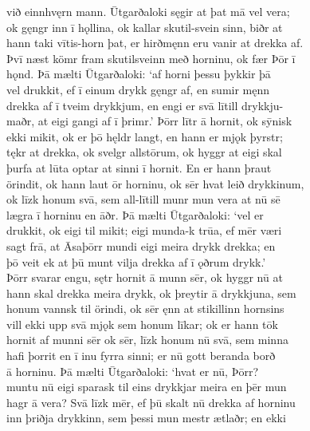 \documentclass[12pt,letterpaper]{book}
\begin{document}
\begin{linenumbers}
við einnhvęrn mann.  Ūtgarðaloki sęgir at þat mā vel vera;\\
ok gęngr inn ī hǫllina, ok kallar skutil-svein sinn, biðr at\\
hann taki vītis-horn þat, er hirðmęnn eru vanir at drekka af.\\
Þvī næst kömr fram skutilsveinn með horninu, ok fær Þōr ī\\
hǫnd.  Þā mælti Ūtgarðaloki: `af horni þessu þykkir þā\\
vel drukkit, ef ī einum drykk gęngr af, en sumir męnn\\
drekka af ī tveim drykkjum, en engi er svā lītill drykkju-\\
maðr, at eigi gangi af ī þrimr.'  Þōrr lītr ā hornit, ok sȳnisk\\
ekki mikit, ok er þō hęldr langt, en hann er mjǫk þyrstr;\\
tękr at drekka, ok svelgr allstōrum, ok hyggr at eigi skal\\
þurfa at lūta optar at sinni ī hornit.  En er hann þraut\\
örindit, ok hann laut ōr horninu, ok sēr hvat leið drykkinum,\\
ok līzk honum svā, sem all-lītill munr mun vera at nū sē\\
lægra ī horninu en āðr.  Þā mælti Ūtgarðaloki: `vel er\\
drukkit, ok eigi til mikit; eigi munda-k trūa, ef mēr væri\\
sagt frā, at Āsaþōrr mundi eigi meira drykk drekka; en\\
þō veit ek at þū munt vilja drekka af ī ǫðrum drykk.'\\
Þōrr svarar engu, sętr hornit ā munn sēr, ok hyggr nū at\\
hann skal drekka meira drykk, ok þreytir ā drykkjuna, sem\\
honum vannsk til örindi, ok sēr ęnn at stikillinn hornsins\\
vill ekki upp svā mjǫk sem honum līkar; ok er hann tōk\\
hornit af munni sēr ok sēr, līzk honum nū svā, sem minna\\
hafi þorrit en ī inu fyrra sinni; er nū gott beranda borð\\
ā horninu.  Þā mælti Ūtgarðaloki: `hvat er nū, Þōrr?\\
muntu nū eigi sparask til eins drykkjar meira en þēr mun\\
hagr ā vera?  Svā līzk mēr, ef þū skalt nū drekka af horninu\\
inn þriðja drykkinn, sem þessi mun mestr ætlaðr; en ekki\\

\end{linenumbers}
\end{document}
